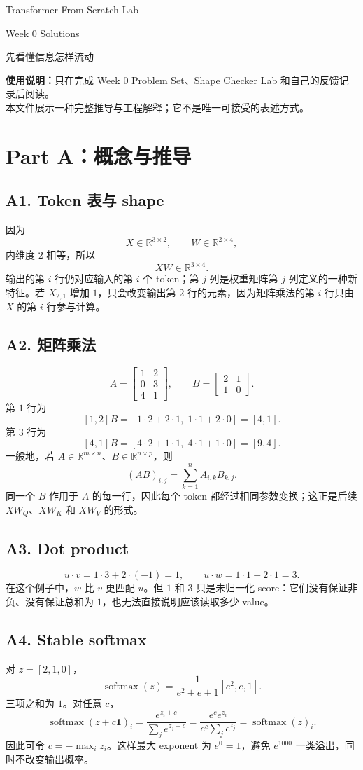 \documentclass[11pt,a4paper]{article}
\newcommand{\heading}[1]{\section*{\color{blue}#1}}
\newcommand{\question}[1]{\subsection*{#1}}
\begin{document}
\begin{center}
{\Large\color{navy} Transformer From Scratch Lab}\par
\vspace{8mm}
{\huge\color{navy} Week 0 Solutions}\par
\vspace{4mm}
{\Large 先看懂信息怎样流动}
\end{center}

\textbf{使用说明：}只在完成 Week 0 Problem Set、Shape Checker Lab 和自己的反馈记录后阅读。\\
本文件展示一种完整推导与工程解释；它不是唯一可接受的表述方式。

\heading{Part A：概念与推导}
\question{A1. Token 表与 shape}
因为
\[
X \in \mathbb{R}^{3 \times 2}, \qquad W \in \mathbb{R}^{2 \times 4},
\]
内维度 $2$ 相等，所以
\[
XW \in \mathbb{R}^{3 \times 4}.
\]
输出的第 $i$ 行仍对应输入的第 $i$ 个 token；第 $j$ 列是权重矩阵第 $j$ 列定义的一种新特征。若 $X_{2,1}$ 增加 $1$，只会改变输出第 $2$ 行的元素，因为矩阵乘法的第 $i$ 行只由 $X$ 的第 $i$ 行参与计算。

\question{A2. 矩阵乘法}
\[
A = \begin{bmatrix} 1 & 2 \\ 0 & 3 \\ 4 & 1 \end{bmatrix},
\qquad
B = \begin{bmatrix} 2 & 1 \\ 1 & 0 \end{bmatrix}.
\]
第 $1$ 行为
\[
[1,2]B = [1\cdot2+2\cdot1,\;1\cdot1+2\cdot0] = [4,1].
\]
第 $3$ 行为
\[
[4,1]B = [4\cdot2+1\cdot1,\;4\cdot1+1\cdot0] = [9,4].
\]
一般地，若 $A \in \mathbb{R}^{m \times n}$、$B \in \mathbb{R}^{n \times p}$，则
\[
(AB)_{i,j}=\sum_{k=1}^{n} A_{i,k}B_{k,j}.
\]
同一个 $B$ 作用于 $A$ 的每一行，因此每个 token 都经过相同参数变换；这正是后续 $XW_Q$、$XW_K$ 和 $XW_V$ 的形式。

\question{A3. Dot product}
\[
u\cdot v = 1\cdot3+2\cdot(-1)=1,
\qquad
u\cdot w = 1\cdot1+2\cdot1=3.
\]
在这个例子中，$w$ 比 $v$ 更匹配 $u$。但 $1$ 和 $3$ 只是未归一化 score：它们没有保证非负、没有保证总和为 $1$，也无法直接说明应该读取多少 value。

\question{A4. Stable softmax}
对 $z=[2,1,0]$，
\[
\operatorname{softmax}(z)=\frac{1}{e^2+e+1}[e^2,e,1].
\]
三项之和为 $1$。对任意 $c$，
\[
\operatorname{softmax}(z+c\mathbf{1})_i
=\frac{e^{z_i+c}}{\sum_j e^{z_j+c}}
=\frac{e^c e^{z_i}}{e^c\sum_j e^{z_j}}
=\operatorname{softmax}(z)_i.
\]
因此可令 $c=-\max_i z_i$。这样最大 exponent 为 $e^0=1$，避免 $e^{1000}$ 一类溢出，同时不改变输出概率。
\end{document}
